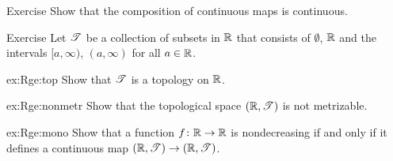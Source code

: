 \begin{thm}{Exercise}\label{ex:composition-continuous}
Show that the composition of continuous maps is continuous. 
\end{thm}


\begin{thm}{Exercise}\label{ex:Rge}
Let $\mathscr{T}$ be a collection of subsets in $\mathbb{R}$ that consists of $\emptyset$, $\mathbb{R}$ and the intervals $[a,\infty)$, $(a,\infty)$ for all $a\in\mathbb{R}$.


\begin{subthm}{ex:Rge:top}
Show that $\mathscr{T}$ is a topology on $\mathbb{R}$.
\end{subthm}

\begin{subthm}{ex:Rge:nonmetr}
Show that the topological space $(\mathbb{R},\mathscr{T})$ is not metrizable.
\end{subthm}

\begin{subthm}{ex:Rge:mono}
Show that a function $f\colon\mathbb{R}\to\mathbb{R}$ is nondecreasing if and only if it defines a continuous map $(\mathbb{R},\mathscr{T})\to (\mathbb{R},\mathscr{T})$.
\end{subthm}

\end{thm}




